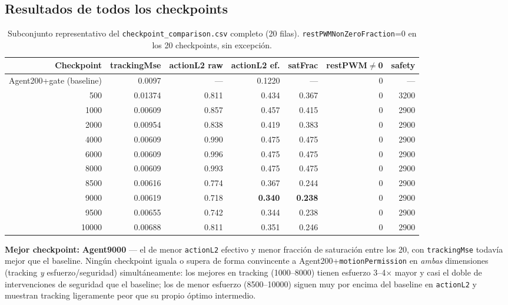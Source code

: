 \documentclass[11pt,a4paper]{article}
\begin{document}
\subsection{Resultados de todos los checkpoints}

\begin{table}[H]
\centering\small
\begin{tabular}{rrrrrrr}
\toprule
Checkpoint & trackingMse & actionL2 raw & actionL2 ef. & satFrac & restPWM$\neq$0 & safety \\
\midrule
Agent200+gate (baseline) & 0.0097 & --- & 0.1220 & --- & 0 & --- \\
\midrule
500 & 0.01374 & 0.811 & 0.434 & 0.367 & 0 & 3200 \\
1000 & 0.00609 & 0.857 & 0.457 & 0.415 & 0 & 2900 \\
2000 & 0.00954 & 0.838 & 0.419 & 0.383 & 0 & 2900 \\
4000 & 0.00609 & 0.990 & 0.475 & 0.475 & 0 & 2900 \\
6000 & 0.00609 & 0.996 & 0.475 & 0.475 & 0 & 2900 \\
8000 & 0.00609 & 0.993 & 0.475 & 0.475 & 0 & 2900 \\
8500 & 0.00616 & 0.774 & 0.367 & 0.244 & 0 & 2900 \\
9000 & 0.00619 & 0.718 & \textbf{0.340} & \textbf{0.238} & 0 & 2900 \\
9500 & 0.00655 & 0.742 & 0.344 & 0.238 & 0 & 2900 \\
10000 & 0.00688 & 0.811 & 0.351 & 0.246 & 0 & 2900 \\
\bottomrule
\end{tabular}
\caption{Subconjunto representativo del \texttt{checkpoint\_comparison.csv} completo
(20 filas). \texttt{restPWMNonZeroFraction}=0 en los 20 checkpoints, sin excepción.}
\label{tab:checkpoints}
\end{table}

\textbf{Mejor checkpoint:} \textbf{Agent9000} --- el de menor \texttt{actionL2}
efectivo y menor fracción de saturación entre los 20, con \texttt{trackingMse} todavía
mejor que el baseline. Ningún checkpoint iguala o supera de forma convincente a
Agent200+\texttt{motionPermission} en \emph{ambas} dimensiones (tracking \emph{y}
esfuerzo/seguridad) simultáneamente: los mejores en tracking (1000--8000) tienen
esfuerzo 3--4$\times$ mayor y casi el doble de intervenciones de seguridad que el
baseline; los de menor esfuerzo (8500--10000) siguen muy por encima del baseline en
\texttt{actionL2} y muestran tracking ligeramente peor que su propio óptimo intermedio.
\end{document}

